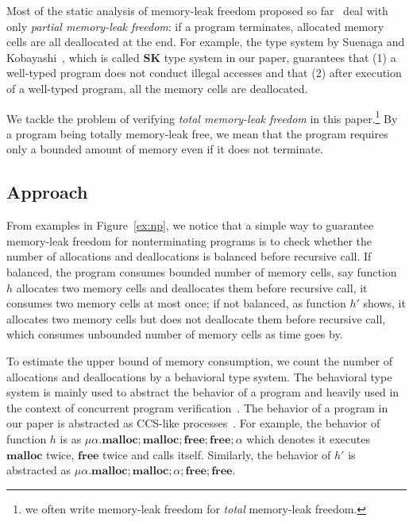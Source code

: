 \documentclass[english]{jssst_ppl} %
\newcommand\Malloc{\mathbf{malloc}}
\newcommand\Free{\mathbf{free}}
\theoremstyle{definition}
\begin{document}
Most of the static analysis of memory-leak freedom proposed so far~\cite{DBLP:conf/aplas/SuenagaK09, DBLP:conf/sas/OrlovichR06,DBLP:conf/pldi/HeineL03,DBLP:conf/sigsoft/XieA05,DBLP:journals/scp/SwamyHMGJ06} deal with only \emph{partial memory-leak freedom}: if a program terminates, allocated memory cells are all deallocated at the end. For example, the type system by Suenaga and Kobayashi~\cite{DBLP:conf/aplas/SuenagaK09}, which is called \textbf{SK} type system in our paper, guarantees that (1) a well-typed program does not conduct illegal accesses and that (2) after execution of a well-typed program, all the memory cells are deallocated.

We tackle the problem of verifying \emph{total memory-leak freedom} in this paper.\footnote{we often write memory-leak freedom for \emph{total} memory-leak freedom.} By a program being totally memory-leak free, we mean that the program requires only a bounded amount of memory even if it does not terminate.

\subsection{Approach}
From examples in Figure~\ref{ex:np}, we notice that a simple way to guarantee memory-leak freedom for nonterminating programs is to check whether the number of allocations and deallocations is balanced before recursive call. If balanced, the program consumes bounded number of memory cells, say function $h$ allocates two memory cells and deallocates them before recursive call, it consumes two memory cells at most once; if not balanced, as function $h'$ shows, it allocates two memory cells but does not deallocate them before recursive call, which consumes unbounded number of memory cells as time goes by.

To estimate the upper bound of memory consumption, we count the number of allocations and deallocations by a behavioral type system. The behavioral type system is mainly used to abstract the behavior of a program and heavily used in the context of concurrent program verification~\cite{DBLP:journals/lmcs/KobayashiSW06,DBLP:journals/tcs/IgarashiK04,DBLP:conf/esop/HondaVK98}. The behavior of a program in our paper is abstracted as CCS-like processes~\cite{DBLP:journals/iandc/MilnerPW92a}. For example, the behavior of function $h$ is as $\mu \alpha. \Malloc;\Malloc;\Free;\Free;\alpha$ which denotes it executes $\Malloc$ twice, $\Free$ twice and calls itself. Similarly, the behavior of $h'$ is abstracted as $\mu \alpha. \Malloc;\Malloc;\alpha;\Free;\Free$.
\end{document}
